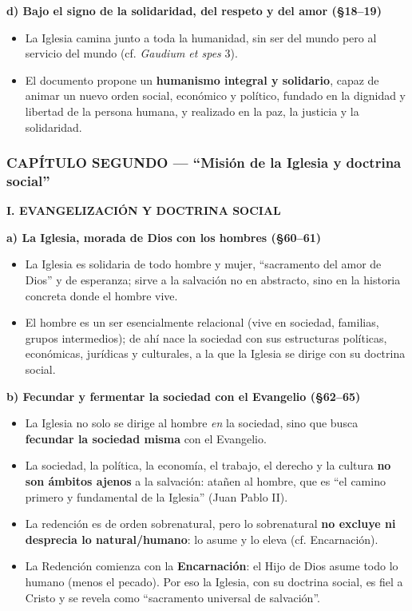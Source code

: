 \documentclass[10pt,a4paper]{article}
\begin{document}
\medskip\noindent \textbf{d) Bajo el signo de la solidaridad, del respeto y del amor (\S{}18--19)}\par\nopagebreak
\begin{itemize}
\item La Iglesia camina junto a toda la humanidad, sin ser del mundo pero al servicio del mundo (cf. \textit{Gaudium et spes} 3).
\item El documento propone un \textbf{humanismo integral y solidario}, capaz de animar un nuevo orden social, económico y político, fundado en la dignidad y libertad de la persona humana, y realizado en la paz, la justicia y la solidaridad.
\end{itemize}



\subsubsection{CAPÍTULO SEGUNDO --- ``Misión de la Iglesia y doctrina social''}

\medskip\noindent \textbf{I. EVANGELIZACIÓN Y DOCTRINA SOCIAL}\par\nopagebreak

\medskip\noindent \textbf{a) La Iglesia, morada de Dios con los hombres (\S{}60--61)}\par\nopagebreak
\begin{itemize}
\item La Iglesia es solidaria de todo hombre y mujer, ``sacramento del amor de Dios'' y de esperanza; sirve a la salvación no en abstracto, sino en la historia concreta donde el hombre vive.
\item El hombre es un ser esencialmente relacional (vive en sociedad, familias, grupos intermedios); de ahí nace la sociedad con sus estructuras políticas, económicas, jurídicas y culturales, a la que la Iglesia se dirige con su doctrina social.
\end{itemize}

\medskip\noindent \textbf{b) Fecundar y fermentar la sociedad con el Evangelio (\S{}62--65)}\par\nopagebreak
\begin{itemize}
\item La Iglesia no solo se dirige al hombre \textit{en} la sociedad, sino que busca \textbf{fecundar la sociedad misma} con el Evangelio.
\item La sociedad, la política, la economía, el trabajo, el derecho y la cultura \textbf{no son ámbitos ajenos} a la salvación: atañen al hombre, que es ``el camino primero y fundamental de la Iglesia'' (Juan Pablo II).
\item La redención es de orden sobrenatural, pero lo sobrenatural \textbf{no excluye ni desprecia lo natural/humano}: lo asume y lo eleva (cf. Encarnación).
\item La Redención comienza con la \textbf{Encarnación}: el Hijo de Dios asume todo lo humano (menos el pecado). Por eso la Iglesia, con su doctrina social, es fiel a Cristo y se revela como ``sacramento universal de salvación''.
\end{itemize}
\end{document}
